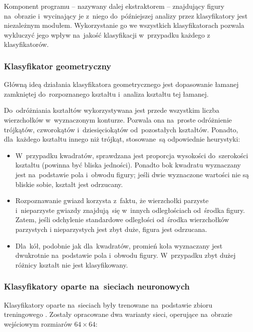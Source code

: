\documentclass[11pt,a4paper]{article}
\begin{document}
\newpage
Komponent programu -- nazywany dalej ekstraktorem -- znajdujący figury na~obrazie i~wycinający je z~niego do~późniejszej analizy przez klasyfikatory jest niezależnym modułem. Wykorzystanie go we wszystkich klasyfikatorach pozwala wykluczyć jego wpływ na~jakość klasyfikacji w~przypadku każdego z klasyfikatorów.

\subsubsection{Klasyfikator geometryczny}

Główną ideą działania klasyfikatora geometrycznego jest dopasowanie łamanej zamkniętej do~rozpoznanego kształtu i~analiza kształtu tej łamanej.

Do~odróżniania kształtów wykorzystywana jest przede wszystkim liczba wierzchołków w~wyznaczonym konturze.
Pozwala ona na~proste odróżnienie trójkątów, czworokątów i~dziesięciokątów od~pozostałych kształtów.
Ponadto, dla~każdego kształtu innego niż trójkąt, stosowane~są odpowiednie heurystyki:

\begin{itemize}
    \item W~przypadku kwadratów, sprawdzana jest proporcja wysokości do~szerokości kształtu (powinna być bliska jedności).
    Ponadto bok kwadratu wyznaczany jest na~podstawie pola i~obwodu figury; jeśli dwie wyznaczone wartości nie są bliskie sobie, kształt jest odrzucany.
    \item Rozpoznawanie gwiazd korzysta z~faktu, że wierzchołki parzyste i~nieparzyste gwiazdy znajdują~się w~innych odległościach od~środka figury.
    Zatem, jeśli odchylenie standardowe odległości od~środka wierzchołków parzystych i nieparzystych jest zbyt duże, figura jest odrzucana.
    \item Dla~kół, podobnie jak dla~kwadratów, promień koła wyznaczany jest dwukrotnie na~podstawie pola i~obwodu figury.
    W~przypadku zbyt dużej różnicy kształt nie jest klasyfikowany.
\end{itemize}

\subsubsection{Klasyfikatory oparte na~sieciach neuronowych}

Klasyfikatory oparte na~sieciach były trenowane na~podstawie zbioru treningowego \cite{shapes}.
Zostały opracowane dwa warianty sieci, operujące na~obrazie wejściowym rozmiarów $64 \times 64$:
\end{document}
